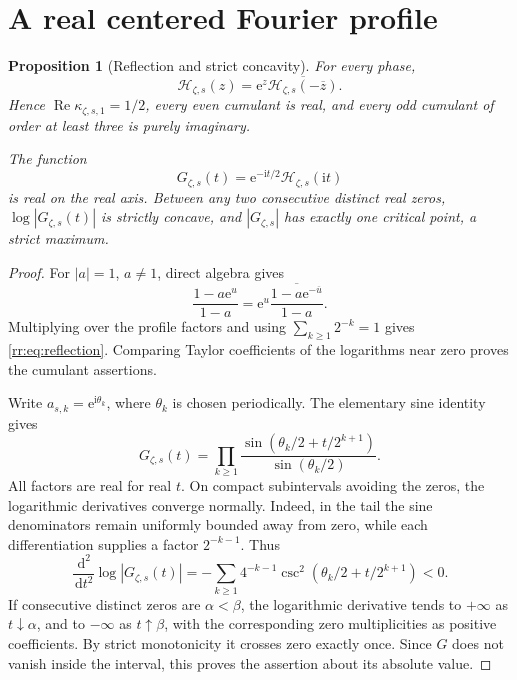 \documentclass[11pt,a4paper,oneside,openany]{book}
\numberwithin{equation}{chapter}
\newtheorem{proposition}[theorem]{Proposition}
\theoremstyle{definition}
\theoremstyle{remark}
\newcommand{\dd}{\,\mathrm d}
\newcommand{\e}{\mathrm e}
\newcommand{\ii}{\mathrm i}
\newcommand{\Hp}{\mathcal H}
\begin{document}
\section{A real centered Fourier profile}
\begin{proposition}[Reflection and strict concavity]
For every phase,
\begin{equation}
 \Hp_{\zeta,s}(z)=\e^z\overline{\Hp_{\zeta,s}(-\overline z)}.
 \label{rr:eq:reflection}
\end{equation}
Hence \(\operatorname{Re}\kappa_{\zeta,s,1}=1/2\), every even cumulant is real, and every odd cumulant of order at least three is purely imaginary.

The function
\begin{equation}
 G_{\zeta,s}(t)=\e^{-\ii t/2}\Hp_{\zeta,s}(\ii t)
 \label{rr:eq:centeredG}
\end{equation}
is real on the real axis. Between any two consecutive distinct real zeros, \(\log|G_{\zeta,s}(t)|\) is strictly concave, and \(|G_{\zeta,s}|\) has exactly one critical point, a strict maximum.
\end{proposition}
\begin{proof}
For \(|a|=1\), \(a\ne1\), direct algebra gives
\[
 \frac{1-a\e^u}{1-a}
 =\e^u\overline{\frac{1-a\e^{-\overline u}}{1-a}}.
\]
Multiplying over the profile factors and using \(\sum_{k\geq1}2^{-k}=1\) gives \eqref{rr:eq:reflection}. Comparing Taylor coefficients of the logarithms near zero proves the cumulant assertions.

Write \(a_{s,k}=\e^{\ii\theta_k}\), where \(\theta_k\) is chosen periodically. The elementary sine identity gives
\begin{equation}
 G_{\zeta,s}(t)=\prod_{k\geq1}
 \frac{\sin(\theta_k/2+t/2^{k+1})}{\sin(\theta_k/2)}.
 \label{rr:eq:sineprofile}
\end{equation}
All factors are real for real \(t\). On compact subintervals avoiding the zeros, the logarithmic derivatives converge normally. Indeed, in the tail the sine denominators remain uniformly bounded away from zero, while each differentiation supplies a factor \(2^{-k-1}\). Thus
\begin{equation}
 \frac{\dd^2}{\dd t^2}\log|G_{\zeta,s}(t)|
 =-\sum_{k\geq1}4^{-k-1}
 \csc^2(\theta_k/2+t/2^{k+1})<0.
 \label{rr:eq:concavity}
\end{equation}
If consecutive distinct zeros are \(\alpha<\beta\), the logarithmic derivative tends to \(+\infty\) as \(t\downarrow\alpha\), and to \(-\infty\) as \(t\uparrow\beta\), with the corresponding zero multiplicities as positive coefficients. By strict monotonicity it crosses zero exactly once. Since \(G\) does not vanish inside the interval, this proves the assertion about its absolute value.
\end{proof}
\end{document}
